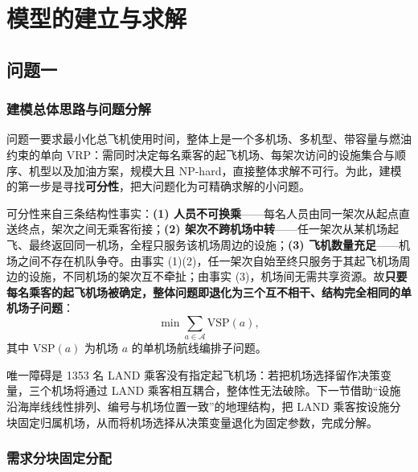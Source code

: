 \documentclass[UTF8,zihao=-4]{ctexart}
\numberwithin{figure}{section}
\numberwithin{table}{section}
\begin{document}
\section{模型的建立与求解}

\subsection{问题一}

\subsubsection{建模总体思路与问题分解}

问题一要求最小化总飞机使用时间，整体上是一个多机场、多机型、带容量与燃油约束的单向 VRP：需同时决定每名乘客的起飞机场、每架次访问的设施集合与顺序、机型以及加油方案，规模大且 NP-hard，直接整体求解不可行。为此，建模的第一步是寻找\textbf{可分性}，把大问题化为可精确求解的小问题。

可分性来自三条结构性事实：\textbf{(1) 人员不可换乘}——每名人员由同一架次从起点直送终点，架次之间无乘客衔接；\textbf{(2) 架次不跨机场中转}——任一架次从某机场起飞、最终返回同一机场，全程只服务该机场周边的设施；\textbf{(3) 飞机数量充足}——机场之间不存在机队争夺。由事实 (1)(2)，任一架次自始至终只服务于其起飞机场周边的设施，不同机场的架次互不牵扯；由事实 (3)，机场间无需共享资源。故\textbf{只要每名乘客的起飞机场被确定，整体问题即退化为三个互不相干、结构完全相同的单机场子问题}：
\begin{equation}
  \min \sum_{a\in\mathcal{A}} \mathrm{VSP}(a),
\end{equation}
其中 $\mathrm{VSP}(a)$ 为机场 $a$ 的单机场航线编排子问题。

唯一障碍是 1353 名 LAND 乘客没有指定起飞机场：若把机场选择留作决策变量，三个机场将通过 LAND 乘客相互耦合，整体性无法破除。下一节借助“设施沿海岸线线性排列、编号与机场位置一致”的地理结构，把 LAND 乘客按设施分块固定归属机场，从而将机场选择从决策变量退化为固定参数，完成分解。

\subsubsection{需求分块固定分配}
\end{document}
